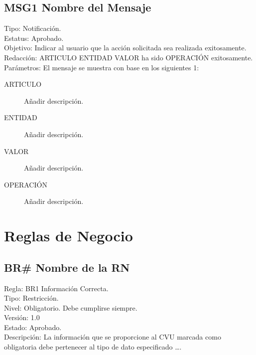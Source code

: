 \documentclass[10pt,letterpaper]{article}
\begin{document}
\subsection{MSG1 Nombre del Mensaje}
\begin{flushleft}
Tipo:	Notificación.\\
Estatus:	Aprobado.\\
Objetivo:	Indicar al usuario que la acción solicitada sea realizada exitosamente.\\
Redacción:	ARTICULO ENTIDAD VALOR ha sido OPERACIÓN exitosamente.\\
Parámetros:	El mensaje se muestra con base en los siguientes 1:\\
\begin{description}
\item[ARTICULO] Añadir descripción.
\item[ENTIDAD] Añadir descripción.
\item[VALOR] Añadir descripción.
\item[OPERACIÓN] Añadir descripción.
\end{description}
\end{flushleft}

\section{Reglas de Negocio}
\subsection{BR\# Nombre de la RN}
\begin{flushleft}
Regla: BR1 Información Correcta.\\
Tipo:	Restricción.\\
Nivel:	Obligatorio. Debe cumplirse siempre.\\
Versión:	1.0\\
Estado:		Aprobado.\\
Descripción:	La información que se proporcione al CVU marcada como obligatoria debe pertenecer al tipo de dato especificado \ldots.
\end{flushleft}
\end{document}
